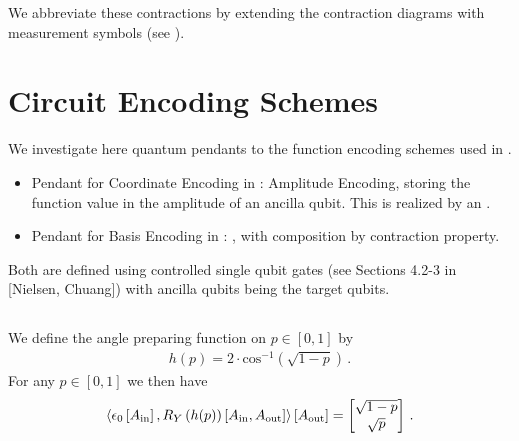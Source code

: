 \documentclass[aps,onecolumn,nofootinbib,pra]{article}
\begin{document}
    We abbreviate these contractions by extending the contraction diagrams with measurement symbols (see ).


    \section{Circuit Encoding Schemes}

    We investigate here quantum pendants to the function encoding schemes used in \tnreason{}{}.

    \begin{itemize}
        \item Pendant for Coordinate Encoding in \tnreason{}: Amplitude Encoding, storing the function value in the amplitude of an ancilla qubit.
        This is realized by an \textbf{\ActivationCircuit{}}.
        \item Pendant for Basis Encoding in \tnreason{}: \textbf{\ComputationCircuit{}}, with composition by contraction property.
    \end{itemize}

    Both are defined using controlled single qubit gates (see Sections 4.2-3 in [Nielsen, Chuang]) with ancilla qubits being the target qubits. %

    \subsection{\ActivationCircuit{}}


    We define the angle preparing function on $p\in[0,1]$ by
    \begin{align*}
        h(p) = 2 \cdot \mathrm{cos}^{-1}\left(\sqrt{1-p}\right) \, .
    \end{align*}
    For any $p\in[0,1]$ we then have
    \begin{align*}
        \left\langle \epsilon_{0}\left[A_{\mathrm{in}}\right],R_Y\left({h(p)}\right)\left[A_{\mathrm{in}},A_{\mathrm{out}}\right]\right\rangle \left[ A_{\mathrm{out}} \right]
        = \begin{bmatrix}
              \sqrt{1-p} \\
              \sqrt{p}
        \end{bmatrix} \, .
    \end{align*}
\end{document}
